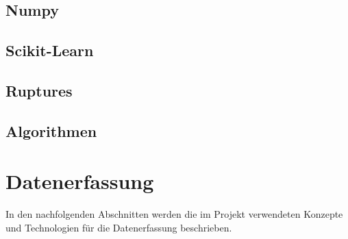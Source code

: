 \documentclass{report}
\begin{document}



\subsection{Numpy}
\subsection{Scikit-Learn}
\subsection{Ruptures}
\subsection{Algorithmen}

\section{Datenerfassung}
In den nachfolgenden Abschnitten werden die im Projekt verwendeten Konzepte und Technologien für die Datenerfassung beschrieben.
\end{document}
